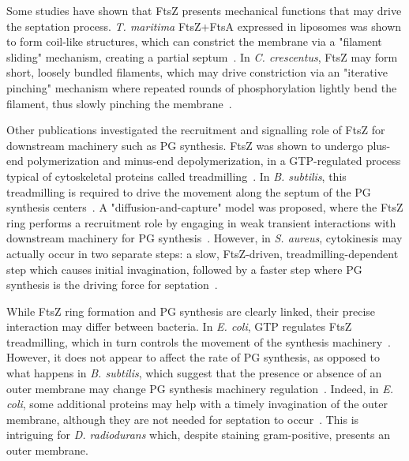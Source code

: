Some studies have shown that FtsZ presents mechanical functions that may drive the septation process.
\textit{T. maritima} FtsZ+FtsA expressed in liposomes was shown to form coil-like structures, which can constrict the membrane via a "filament sliding" mechanism, creating a partial septum~\cite{szwedziakArchitectureRingFormed2014}.
In \textit{C. crescentus}, FtsZ may form short, loosely bundled filaments, which may drive constriction via an "iterative pinching" mechanism where repeated rounds of phosphorylation lightly bend the filament, thus slowly pinching the membrane~\cite{liStructureFtsZFilaments2007}.

Other publications investigated the recruitment and signalling role of FtsZ for downstream machinery such as PG synthesis.
FtsZ was shown to undergo plus-end polymerization and minus-end depolymerization, in a GTP-regulated process typical of cytoskeletal proteins called treadmilling~\cite{looseBacterialCellDivision2014}.
In \textit{B. subtilis}, this treadmilling is required to drive the movement along the septum of the PG synthesis centers~\cite{bisson-filhoTreadmillingFtsZFilaments2017}.
A "diffusion-and-capture" model was proposed, where the FtsZ ring performs a recruitment role by engaging in weak transient interactions with downstream machinery for PG synthesis~\cite{baranovaDiffusionCapturePermits2020}.
However, in \textit{S. aureus}, cytokinesis may actually occur in two separate steps: a slow, FtsZ-driven, treadmilling-dependent step which causes initial invagination, followed by a faster step where PG synthesis is the driving force for septation~\cite{monteiroPeptidoglycanSynthesisDrives2018}.

While FtsZ ring formation and PG synthesis are clearly linked, their precise interaction may differ between bacteria.
In \textit{E. coli}, GTP regulates FtsZ treadmilling, which in turn controls the movement of the synthesis machinery~\cite{yangGTPaseActivityCoupled2017}.
However, it does not appear to affect the rate of PG synthesis, as opposed to what happens in \textit{B. subtilis}, which suggest that the presence or absence of an outer membrane may change PG synthesis machinery regulation~\cite{yangGTPaseActivityCoupled2017}.
Indeed, in \textit{E. coli}, some additional proteins may help with a timely invagination of the outer membrane, although they are not needed for septation to occur~\cite{gerdingTransenvelopeTolPal2007}.
This is intriguing for \textit{D. radiodurans} which, despite staining gram-positive, presents an outer membrane.

